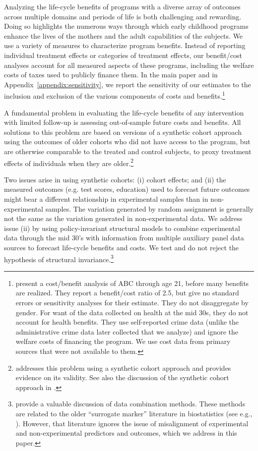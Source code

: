 Analyzing the life-cycle benefits of programs with a diverse array of outcomes across multiple domains and periods of life is both challenging and rewarding. Doing so highlights the numerous ways through which early childhood programs enhance the lives of the mothers and the adult capabilities of the subjects. We use a variety of measures to characterize program benefits. Instead of reporting individual treatment effects or categories of treatment effects, our benefit/cost analyses account for all measured aspects of these programs, including the welfare costs of taxes used to publicly finance them. In the main paper and in Appendix~\ref{appendix:sensitivity}, we report the sensitivity of our estimates to the inclusion and exclusion of the various components of costs and benefits.\footnote{\cite{Barnett_Masse_2002_benefitcost,Barnett_Masse_2007_EER} present a cost/benefit analysis of ABC through age 21, before many benefits are realized. They report a benefit/cost ratio of 2.5, but give no standard errors or sensitivity analyses for their estimate. They do not disaggregate by gender. For want of the data collected on health at the mid 30s, they do not account for health benefits. They use self-reported crime data (unlike the administrative crime data later collected that we analyze) and ignore the welfare costs of financing the program. We use cost data from primary sources that were not available to them.}

A fundamental problem in evaluating the life-cycle benefits of any intervention with limited follow-up is assessing out-of-sample future costs and benefits. All solutions to this problem are based on versions of a synthetic cohort approach using the outcomes of older cohorts who did not have access to the program, but are otherwise comparable to the treated and control subjects, to proxy treatment effects of individuals when they are older.\footnote{\cite{Mincer_1974_schooling} addresses this problem using a synthetic cohort approach and provides evidence on its validity. See also the discussion of the synthetic cohort approach in \cite{Heckman_Lochner_ea_2006_HEE}.}

Two issues arise in using  synthetic cohorts: (i) cohort effects; and (ii) the measured outcomes (e.g. test scores, education) used to forecast future outcomes might bear a different relationship in experimental samples than in non-experimental samples. The variation generated by random assignment is generally not the same as the variation generated in non-experimental data. We address issue (ii) by using policy-invariant structural models to combine experimental data through the mid 30's with information from multiple auxiliary panel data sources to forecast life-cycle benefits and costs. We test and do not reject the hypothesis of structural invariance.\footnote{\citet{Ridder_Moffitt_2007_hbk_metricsdata} provide a valuable discussion of data combination methods. These methods are related to the older ``surrogate marker'' literature in biostatistics (see e.g., \citealp{Prentice_1989_Surrogate_SiM}). However, that literature ignores the issue of misalignment of experimental and non-experimental predictors and outcomes, which we address in this paper.}

